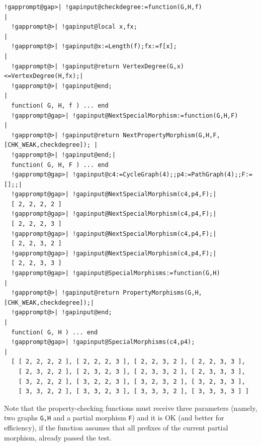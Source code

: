 \documentclass[a4paper,11pt]{report}
\begin{document}
{{ 
\begin{Verbatim}[commandchars=!@|,fontsize=\small,frame=single,label=Example]
  !gapprompt@gap>| !gapinput@checkdegree:=function(G,H,f)                |
  !gapprompt@>| !gapinput@local x,fx;                                 |
  !gapprompt@>| !gapinput@x:=Length(f);fx:=f[x];                      |
  !gapprompt@>| !gapinput@return VertexDegree(G,x)<=VertexDegree(H,fx);|
  !gapprompt@>| !gapinput@end;                                         |
  function( G, H, f ) ... end
  !gapprompt@gap>| !gapinput@NextSpecialMorphism:=function(G,H,F)                   |
  !gapprompt@>| !gapinput@return NextPropertyMorphism(G,H,F,[CHK_WEAK,checkdegree]); |
  !gapprompt@>| !gapinput@end;|
  function( G, H, F ) ... end
  !gapprompt@gap>| !gapinput@c4:=CycleGraph(4);;p4:=PathGraph(4);;F:=[];;|
  !gapprompt@gap>| !gapinput@NextSpecialMorphism(c4,p4,F);|
  [ 2, 2, 2, 2 ]
  !gapprompt@gap>| !gapinput@NextSpecialMorphism(c4,p4,F);|
  [ 2, 2, 2, 3 ]
  !gapprompt@gap>| !gapinput@NextSpecialMorphism(c4,p4,F);|
  [ 2, 2, 3, 2 ]
  !gapprompt@gap>| !gapinput@NextSpecialMorphism(c4,p4,F);|
  [ 2, 2, 3, 3 ]
  !gapprompt@gap>| !gapinput@SpecialMorphisms:=function(G,H)                     |
  !gapprompt@>| !gapinput@return PropertyMorphisms(G,H,[CHK_WEAK,checkdegree]);|
  !gapprompt@>| !gapinput@end;                                                 |
  function( G, H ) ... end
  !gapprompt@gap>| !gapinput@SpecialMorphisms(c4,p4);                             |
  [ [ 2, 2, 2, 2 ], [ 2, 2, 2, 3 ], [ 2, 2, 3, 2 ], [ 2, 2, 3, 3 ], 
    [ 2, 3, 2, 2 ], [ 2, 3, 2, 3 ], [ 2, 3, 3, 2 ], [ 2, 3, 3, 3 ], 
    [ 3, 2, 2, 2 ], [ 3, 2, 2, 3 ], [ 3, 2, 3, 2 ], [ 3, 2, 3, 3 ], 
    [ 3, 3, 2, 2 ], [ 3, 3, 2, 3 ], [ 3, 3, 3, 2 ], [ 3, 3, 3, 3 ] ]
\end{Verbatim}
 Note that the property-checking functions must receive three parameters
(namely, two graphs \texttt{G,H} and a partial morphism \texttt{F}) and it is OK (and better for efficiency), if the function assumes that all
prefixes of the current partial morphism, already passed the test. }

 }

 
\end{document}
